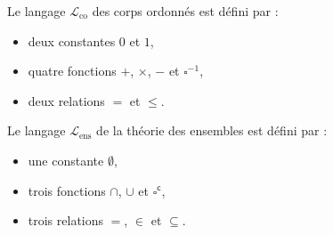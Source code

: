 \documentclass[./main]{subfiles}
\begin{document}
  \begin{exm}
    Le langage $\mathcal{L}_\mathrm{co}$ des corps ordonnés est défini par :
    \begin{itemize}
      \item deux constantes $0$ et $1$,
      \item quatre fonctions $+$, $\times$, $-$ et $\square^{-1}$,
      \item deux relations $=$ et $\le$.
    \end{itemize}
  \end{exm}

  \begin{exm}
    Le langage $\mathcal{L}_\mathrm{ens}$ de la théorie des ensembles est défini par :
    \begin{itemize}
      \item une constante $\emptyset$,
      \item trois fonctions $\cap$, $\cup$ et $\square^\mathsf{c}$,
      \item trois relations $=$, $\in$ et $\subseteq$.
    \end{itemize}
  \end{exm}
\end{document}
